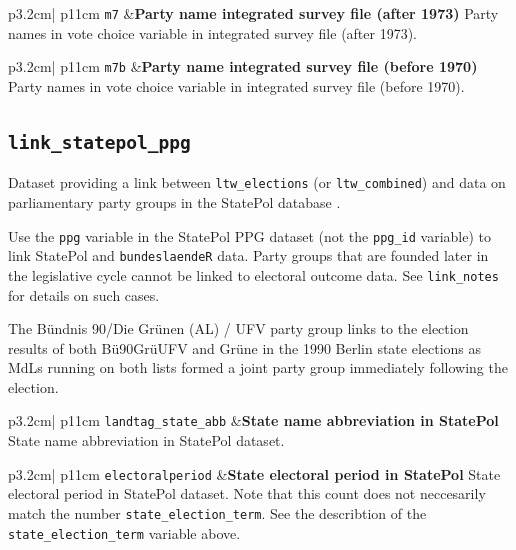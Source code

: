 \documentclass[
  a4paper,
  DIV=11,
  numbers=noendperiod]{scrartcl}
\begin{document}
\begin{longtable*}{p{3.2cm}| p{11cm}}
\texttt{m7} &\textbf{Party name integrated survey file (after 1973)}\newline 
Party names in vote choice variable in integrated survey file (after 1973).
\end{longtable*}

\begin{longtable*}{p{3.2cm}| p{11cm}}
\texttt{m7b} &\textbf{Party name integrated survey file (before 1970)}\newline 
Party names in vote choice variable in integrated survey file (before 1970).
\end{longtable*}

\newpage

\subsection{\texorpdfstring{\texttt{link\_statepol\_ppg}}{link\_statepol\_ppg}}\label{link_statepol_ppg}

Dataset providing a link between \texttt{ltw\_elections} (or
\texttt{ltw\_combined}) and data on parliamentary party groups in the
StatePol database \parencite{kochStatePolDatenbankMitgliedern2024a}.

Use the \texttt{ppg} variable in the StatePol PPG dataset (not the
\texttt{ppg\_id} variable) to link StatePol and \texttt{bundeslaendeR}
data. Party groups that are founded later in the legislative cycle
cannot be linked to electoral outcome data. See \texttt{link\_notes} for
details on such cases.

The Bündnis 90/Die Grünen (AL) / UFV party group links to the election
results of both Bü90GrüUFV and Grüne in the 1990 Berlin state elections
as MdLs running on both lists formed a joint party group immediately
following the election.

\begin{longtable*}{p{3.2cm}| p{11cm}}
\texttt{landtag\_state\_abb} &\textbf{State name abbreviation in StatePol}\newline 
State name abbreviation in StatePol dataset.
\end{longtable*}

\begin{longtable*}{p{3.2cm}| p{11cm}}
\texttt{electoralperiod} &\textbf{State electoral period in StatePol}\newline 
State electoral period in StatePol dataset. Note that this count does not neccesarily match the number \texttt{state\_election\_term}. See the describtion of the \texttt{state\_election\_term} variable above.
\end{longtable*}
\end{document}
